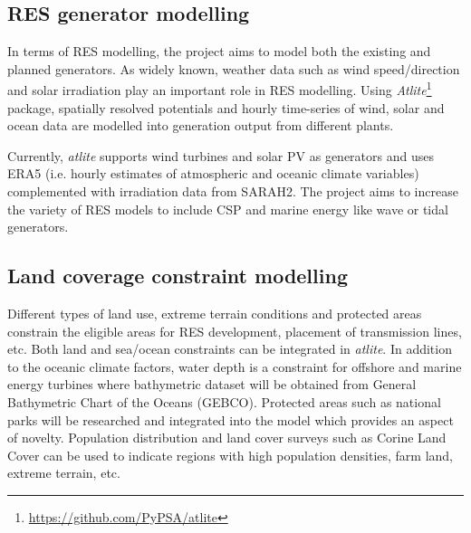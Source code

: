 \documentclass[conference, a4paper]{IEEEtran}
\begin{document}
\subsection{RES generator modelling} %
In terms of RES modelling, the project aims to model both the existing and planned generators. As widely known, weather data such as wind speed/direction and solar irradiation play an important role in RES modelling. Using \emph{Atlite}\footnote{\url{https://github.com/PyPSA/atlite}} package, spatially resolved potentials and hourly time-series of wind, solar and ocean data are modelled into generation output from different plants. 

Currently, \emph{atlite} supports wind turbines and solar PV as generators and uses ERA5 (i.e. hourly estimates of atmospheric and oceanic climate variables) complemented with irradiation data from SARAH2.
The project aims to increase the variety of RES models to include CSP and marine energy like wave or tidal generators.


\subsection{Land coverage constraint modelling} %
Different types of land use, extreme terrain conditions and protected areas constrain the eligible areas for RES development, placement of transmission lines, etc. Both land and sea/ocean constraints can be integrated in \emph{atlite}. In addition to the oceanic climate factors, water depth is a constraint for offshore and marine energy turbines where bathymetric dataset will be obtained from General Bathymetric Chart of the Oceans (GEBCO). Protected areas such as national parks will be researched and integrated into the model which provides an aspect of novelty. Population distribution and land cover surveys such as Corine Land Cover can be used to indicate regions with high population densities, farm land, extreme terrain, etc.
\end{document}
